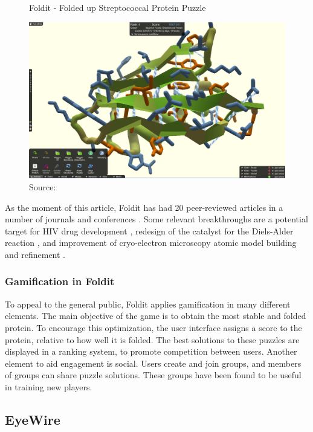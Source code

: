 \begin{figure}[ht]
    \centering
    \caption{Foldit - Folded up Streptococcal Protein Puzzle}
    \includegraphics[width=0.8\linewidth]{images/background/foldit-solution.png}
    \caption*{Source: \cite{foldit-protein-solution}}
    \label{fig:foldit-solution}
\end{figure}

As the moment of this article, Foldit has had 20 peer-reviewed articles in a number of journals and conferences \cite{foldit2021publications}. Some relevant breakthroughs are a potential target for HIV drug development \cite{khatib2011crystal}, redesign of the catalyst for the Diels-Alder reaction \cite{eiben2012increased}, and improvement of cryo-electron microscopy atomic model building and refinement \cite{khatib2019building}.

\subsubsection{Gamification in Foldit}

To appeal to the general public, Foldit applies gamification in many different elements. The main objective of the game is to obtain the most stable and folded protein. To encourage this optimization, the user interface assigns a score to the protein, relative to how well it is folded. The best solutions to these puzzles are displayed in a ranking system, to promote competition between users. Another element to aid engagement is social. Users create and join groups, and members of groups can share puzzle solutions. These groups have been found to be useful in training new players.

\subsection{EyeWire}

